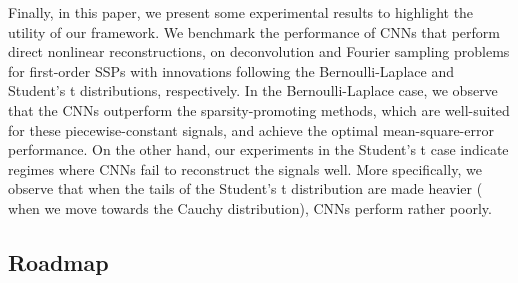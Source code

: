 \documentclass[journal]{IEEEtran}
\begin{document}
Finally, in this paper, we present some experimental results to highlight the utility of our framework. We benchmark the performance of CNNs that perform direct nonlinear reconstructions, on deconvolution and Fourier sampling problems for first-order SSPs with innovations following the Bernoulli-Laplace and Student's t distributions, respectively. In the Bernoulli-Laplace case, we observe that the CNNs outperform the sparsity-promoting methods, which are well-suited for these piecewise-constant signals, and achieve the optimal mean-square-error performance. On the other hand, our experiments in the Student's t case indicate regimes where CNNs fail to reconstruct the signals well. More specifically, we observe that when the tails of the Student's t distribution are made heavier ( when we move towards the Cauchy distribution), CNNs perform rather poorly.       




\subsection{Roadmap}


\end{document}

